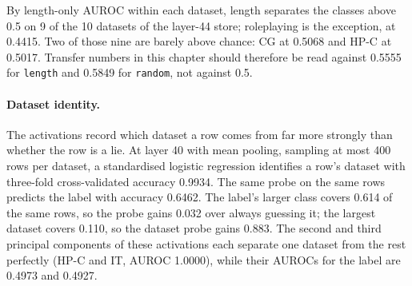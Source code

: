 By length-only AUROC within each dataset, length separates the classes above 0.5 on 9 of the 10 datasets of the layer-44 store; roleplaying is the exception, at 0.4415. %
Two of those nine are barely above chance: CG at 0.5068 and HP-C at 0.5017. %
Transfer numbers in this chapter should therefore be read against 0.5555 for \texttt{length} and 0.5849 for \texttt{random}, not against 0.5. %

\paragraph{Dataset identity.}
The activations record which dataset a row comes from far more strongly than whether the row is a lie. %
At layer 40 with mean pooling, sampling at most 400 rows per dataset, a standardised logistic regression identifies a row's dataset with three-fold cross-validated accuracy 0.9934. %
The same probe on the same rows predicts the label with accuracy 0.6462. %
The label's larger class covers 0.614 of the same rows, so the probe gains 0.032 over always guessing it; the largest dataset covers 0.110, so the dataset probe gains 0.883. %
The second and third principal components of these activations each separate one dataset from the rest perfectly (HP-C and IT, AUROC 1.0000), while their AUROCs for the label are 0.4973 and 0.4927. %
